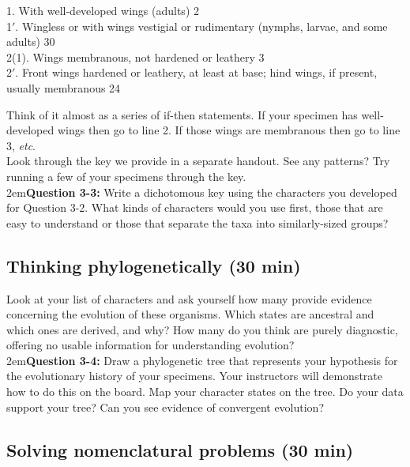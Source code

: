 \documentclass[letterpaper, 11pt]{article}
\begin{document}
\begin{adjustwidth}{1cm}{}
1. With well-developed wings (adults) \dotfill{} 2\\
1$'$. Wingless or with wings vestigial or rudimentary (nymphs, larvae, and some adults) \dotfill{} 30\\

\noindent{}2(1). Wings membranous, not hardened or leathery \dotfill{} 3\\
2$'$. Front wings hardened or leathery, at least at base; hind wings, if present, usually membranous \dotfill{}24\\
\end{adjustwidth}

\noindent{}Think of it almost as a series of if-then statements. If your specimen has well-developed wings then go to line 2. If those wings are membranous then go to line 3, \textit{etc}.\\

\noindent{}Look through the key we provide in a separate handout. See any patterns? Try running a few of your specimens through the key. \\

\hangindent2em\textbf{Question 3-3:} Write a dichotomous key using the characters you developed for Question 3-2. What kinds of characters would you use first, those that are easy to understand or those that separate the taxa into similarly-sized groups?\\

\subsection{Thinking phylogenetically (30 min)}
Look at your list of characters and ask yourself how many provide evidence concerning the evolution of these organisms. Which states are ancestral and which ones are derived, and why? How many do you think are purely diagnostic, offering no usable information for understanding evolution?\\

\hangindent2em\textbf{Question 3-4:} Draw a phylogenetic tree that represents your hypothesis for the evolutionary history of your specimens. Your instructors will demonstrate how to do this on the board. Map your character states on the tree. Do your data support your tree? Can you see evidence of convergent evolution?\\

\subsection{Solving nomenclatural problems (30 min)}
\end{document}
